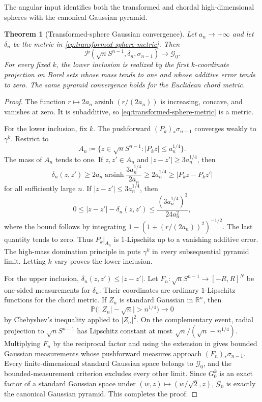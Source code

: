 \documentclass{amsart}
\numberwithin{equation}{section}
\theoremstyle{plain}
\newtheorem{theorem}{Theorem}[section]
\theoremstyle{definition}
\theoremstyle{remark}
\newcommand{\R}{\mathbb R}
\newcommand{\Pyr}{\mathcal P}
\DeclareMathOperator{\arsinh}{arsinh}
\begin{document}
The angular input identifies both the transformed and chordal high-dimensional spheres with the canonical Gaussian pyramid.

\begin{theorem}[Transformed-sphere Gaussian convergence]\label{thm:transformed-sphere-gaussian}
Let $a_n\to+\infty$ and let $\delta_n$ be the metric in \eqref{eq:transformed-sphere-metric}.  Then
\[ \Pyr(\sqrt nS^{n-1},\delta_n,\sigma_{n-1}) \longrightarrow\mathcal G_0. \]
For every fixed $k$, the lower inclusion is realized by the first $k$-coordinate projection on Borel sets whose mass tends to one and whose additive error tends to zero.  The same pyramid convergence holds for the Euclidean chord metric.
\end{theorem}

\begin{proof}
The function $r\mapsto2a_n\arsinh(r/(2a_n))$ is increasing, concave, and vanishes at zero.  It is subadditive, so \eqref{eq:transformed-sphere-metric} is a metric.

For the lower inclusion, fix $k$.  The pushforward $(P_k)_*\sigma_{n-1}$ converges weakly to $\gamma^k$.  Restrict to
\[ A_n\coloneqq\{z\in\sqrt nS^{n-1}\colon|P_kz|\le a_n^{1/4}\}. \]
The mass of $A_n$ tends to one.  If $z,z'\in A_n$ and $|z-z'|\ge3a_n^{1/4}$, then
\[ \delta_n(z,z') \ge2a_n\arsinh\frac{3a_n^{1/4}}{2a_n} \ge2a_n^{1/4} \ge|P_kz-P_kz'| \]
for all sufficiently large $n$.  If $|z-z'|\le3a_n^{1/4}$, then
\[ 0\le |z-z'|-\delta_n(z,z') \le\frac{(3a_n^{1/4})^3}{24a_n^2}, \]
where the bound follows by integrating $1-(1+(r/(2a_n))^2)^{-1/2}$.  The last quantity tends to zero.  Thus $P_k|_{A_n}$ is $1$-Lipschitz up to a vanishing additive error.  The high-mass domination principle in  puts $\gamma^k$ in every subsequential pyramid limit.  Letting $k$ vary proves the lower inclusion.

For the upper inclusion, $\delta_n(z,z')\le|z-z'|$.  Let $F_n\colon\sqrt nS^{n-1}\to[-R,R]^N$ be one-sided measurements for $\delta_n$.  Their coordinates are ordinary $1$-Lipschitz functions for the chord metric.  If $Z_n$ is standard Gaussian in $\R^n$, then
\[ \mathbb P\bigl(\bigl||Z_n|-\sqrt n\bigr|>n^{1/4}\bigr)\longrightarrow0 \]
by Chebyshev's inequality applied to $|Z_n|^2$.  On the complementary event, radial projection to $\sqrt nS^{n-1}$ has Lipschitz constant at most $\sqrt n/(\sqrt n-n^{1/4})$.  Multiplying $F_n$ by the reciprocal factor and using the extension in  gives bounded Gaussian measurements whose pushforward measures approach $(F_n)_*\sigma_{n-1}$.  Every finite-dimensional standard Gaussian space belongs to $\mathcal G_0$, and the bounded-measurement criterion excludes every other limit.  Since $G_0^k$ is an exact factor of a standard Gaussian space under $(w,z)\mapsto(w/\sqrt2,z)$, $\mathcal G_0$ is exactly the canonical Gaussian pyramid.  This completes the proof.
\end{proof}
\end{document}
